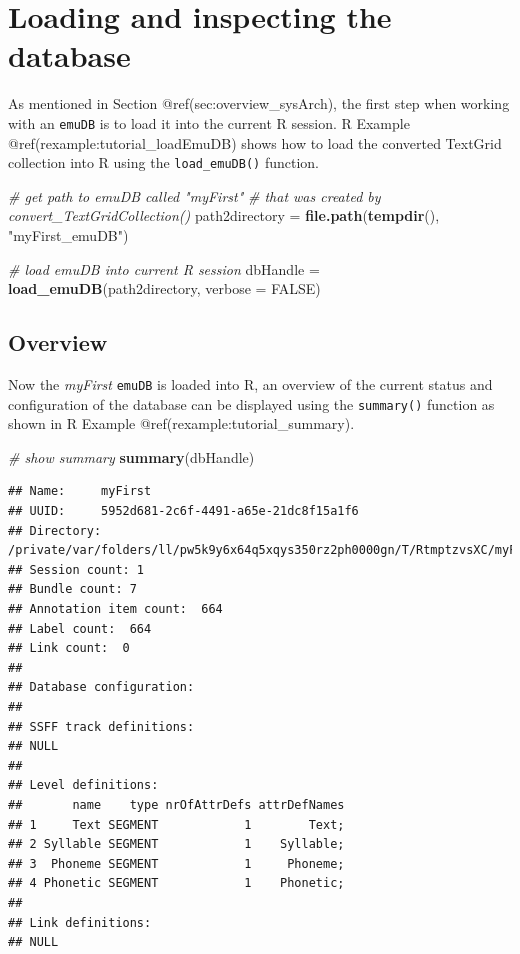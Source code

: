 \documentclass[]{book}
\newenvironment{Shaded}{\begin{snugshade}}{\end{snugshade}}
\newcommand{\KeywordTok}[1]{\textcolor[rgb]{0.13,0.29,0.53}{\textbf{{#1}}}}
\newcommand{\DataTypeTok}[1]{\textcolor[rgb]{0.13,0.29,0.53}{{#1}}}
\newcommand{\StringTok}[1]{\textcolor[rgb]{0.31,0.60,0.02}{{#1}}}
\newcommand{\CommentTok}[1]{\textcolor[rgb]{0.56,0.35,0.01}{\textit{{#1}}}}
\newcommand{\OtherTok}[1]{\textcolor[rgb]{0.56,0.35,0.01}{{#1}}}
\newcommand{\NormalTok}[1]{{#1}}
\theoremstyle{definition}
\theoremstyle{definition}
\theoremstyle{definition}
\theoremstyle{remark}
\begin{document}
\section{Loading and inspecting the
database}\label{loading-and-inspecting-the-database}

As mentioned in Section @ref(sec:overview\_sysArch), the first step when
working with an \texttt{emuDB} is to load it into the current R session.
R Example @ref(rexample:tutorial\_loadEmuDB) shows how to load the
converted TextGrid collection into R using the \texttt{load\_emuDB()}
function.

\begin{Shaded}
\begin{Highlighting}[]
\CommentTok{# get path to emuDB called "myFirst"}
\CommentTok{# that was created by convert_TextGridCollection()}
\NormalTok{path2directory =}\StringTok{ }\KeywordTok{file.path}\NormalTok{(}\KeywordTok{tempdir}\NormalTok{(), }\StringTok{"myFirst_emuDB"}\NormalTok{)}

\CommentTok{# load emuDB into current R session}
\NormalTok{dbHandle =}\StringTok{ }\KeywordTok{load_emuDB}\NormalTok{(path2directory, }\DataTypeTok{verbose =} \OtherTok{FALSE}\NormalTok{)}
\end{Highlighting}
\end{Shaded}

\subsection{Overview}\label{overview}

Now the \emph{myFirst} \texttt{emuDB} is loaded into R, an overview of
the current status and configuration of the database can be displayed
using the \texttt{summary()} function as shown in R Example
@ref(rexample:tutorial\_summary).

\begin{Shaded}
\begin{Highlighting}[]
\CommentTok{# show summary}
\KeywordTok{summary}\NormalTok{(dbHandle)}
\end{Highlighting}
\end{Shaded}

\begin{verbatim}
## Name:     myFirst 
## UUID:     5952d681-2c6f-4491-a65e-21dc8f15a1f6 
## Directory:    /private/var/folders/ll/pw5k9y6x64q5xqys350rz2ph0000gn/T/RtmptzvsXC/myFirst_emuDB 
## Session count: 1 
## Bundle count: 7 
## Annotation item count:  664 
## Label count:  664 
## Link count:  0 
## 
## Database configuration:
## 
## SSFF track definitions:
## NULL
## 
## Level definitions:
##       name    type nrOfAttrDefs attrDefNames
## 1     Text SEGMENT            1        Text;
## 2 Syllable SEGMENT            1    Syllable;
## 3  Phoneme SEGMENT            1     Phoneme;
## 4 Phonetic SEGMENT            1    Phonetic;
## 
## Link definitions:
## NULL
\end{verbatim}
\end{document}
